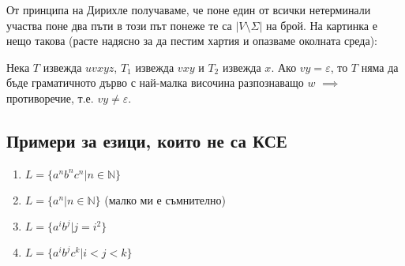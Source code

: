 \documentclass[fleqn,12pt]{article}
\begin{document}
\begin{flushleft}
От принципа на Дирихле получаваме, че поне един от всички нетерминали участва поне два пъти в този път понеже те са $|V \setminus \Sigma|$ на брой. На картинка е нещо такова (расте надясно за да пестим хартия и опазваме околната среда):

\begin{center}
\end{center}


Нека $T$ извежда $uvxyz$, $T_1$ извежда $vxy$ и $T_2$ извежда $x$. Ако $vy = \varepsilon$, то $T$ няма да бъде граматичното дърво с най-малка височина разпознаващо $w$ $\implies$ противоречие, т.е. $vy \neq \varepsilon$.

\begin{center}
\end{center}

\begin{center}
\end{center}

\subsection{Примери за езици, които не са КСЕ}

\begin{enumerate}
    \item $L = \{a^nb^nc^n | n \in \mathbb{N} \}$
    \item $L = \{a^n | n \in \mathbb{N}\}$ (малко ми е съмнително)
    \item $L = \{a^ib^j | j = i^2\}$
    \item $L = \{a^ib^jc^k | i < j < k\}$
\end{enumerate}


\end{flushleft}
\end{document}
